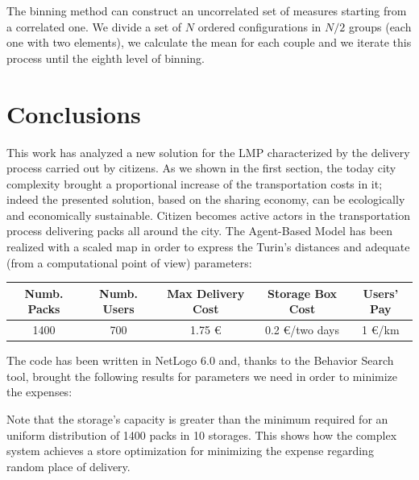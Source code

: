 \documentclass[11pt,a4paper]{article}
\begin{document}
The binning method can construct an uncorrelated set of measures starting from a correlated one. We divide a set of $N$ ordered configurations in $N/2$ groups (each one with two elements), we calculate the mean for each couple and we iterate this process until the eighth level of binning.

\newpage
\section{Conclusions}
This work has analyzed a new solution for the LMP characterized by the delivery process carried out by citizens. As we shown in the first section, the today city complexity brought a proportional increase of the transportation costs in it; indeed the presented solution, based on the sharing economy, can be ecologically and economically sustainable. Citizen becomes active actors in the transportation process delivering packs all around the city. The Agent-Based Model has been realized with a scaled map in order to express the Turin's distances and adequate (from a computational point of view) parameters: 
\begin{center}
\begin{tabular}{c|c|c|c|c}
 \hline 
 Numb. Packs & Numb. Users & Max Delivery Cost & Storage Box Cost & Users' Pay \\ 
 \hline 
 \hline
 1400 & 700 & 1.75 \euro{} & 0.2 \euro{}/two days & 1 \euro{}/km \\ 
 \hline 
\end{tabular} 
\end{center} 
The code has been written in NetLogo 6.0 and, thanks to the Behavior Search tool, brought the following results for parameters we need in order to minimize the expenses: 
\begin{center}
 \end{center}
Note that the storage's capacity is greater than the minimum required for an uniform distribution of 1400 packs in 10 storages. This shows how the complex system achieves a store optimization for minimizing the expense regarding random place of delivery.
\bigskip
\end{document}
